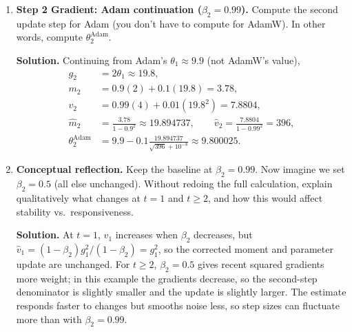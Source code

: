 \documentclass[11pt]{article}
\begin{document}
\begin{enumerate}[label=\textbf{Q\arabic*.}, leftmargin=2.2em, resume]
\par\smallskip
\textbf{Solution.} Evaluate the first gradient at $\theta_0$ (in general,
$g_t=2\theta_{t-1}$ for an update indexed by $t$).
\begin{align*}
\text{(a)}\quad &g_1=20,\quad m_1=0.1(20)=2,\quad v_1=0.01(20^2)=4.\\
\text{(b)}\quad &\hat m_1=2/(1-0.9)=20,\quad \hat v_1=4/(1-0.99)=400.\\
\text{(c)}\quad &\theta_1^{\mathrm{Adam}}=10-0.1\frac{20}{20+10^{-8}}\approx9.9.\\
\text{(d)}\quad &\theta_1^{\mathrm{AdamW}}=\theta_1^{\mathrm{Adam}}-0.1(0.01)(10)\approx9.89.
\end{align*}

\item \textbf{Step 2 Gradient: Adam continuation ($\beta_2 = 0.99$).}
Compute the second update step for Adam (you don't have to compute for AdamW). In other words, compute $\theta_2^{\text{Adam}}$.
\par\smallskip
\textbf{Solution.} Continuing from Adam's $\theta_1\approx9.9$ (not AdamW's value),
\begin{align*}
g_2&=2\theta_1\approx19.8,\\
m_2&=0.9(2)+0.1(19.8)=3.78,\\
v_2&=0.99(4)+0.01(19.8^2)=7.8804,\\
\hat m_2&=\frac{3.78}{1-0.9^2}\approx19.894737,\qquad
\hat v_2=\frac{7.8804}{1-0.99^2}=396,\\
\theta_2^{\mathrm{Adam}}&=9.9-0.1\frac{19.894737}{\sqrt{396}+10^{-8}}
\approx\boxed{9.800025}.
\end{align*}


\item \textbf{Conceptual reflection.}
Keep the baseline at $\beta_2 = 0.99$. Now imagine we set $\beta_2 = 0.5$ (all else unchanged).
Without redoing the full calculation, explain qualitatively what changes at $t=1$ and $t\ge2$,
and how this would affect stability vs.\ responsiveness.

\par\smallskip
\textbf{Solution.} At $t=1$, $v_1$ increases when $\beta_2$ decreases, but
$\hat v_1=(1-\beta_2)g_1^2/(1-\beta_2)=g_1^2$, so the corrected moment and parameter update are unchanged.
For $t\ge2$, $\beta_2=0.5$ gives recent squared gradients more weight; in this example the gradients decrease, so the second-step denominator is slightly smaller and the update is slightly larger.
The estimate responds faster to changes but smooths noise less, so step sizes can fluctuate more than with $\beta_2=0.99$.

\end{enumerate}
\end{document}
